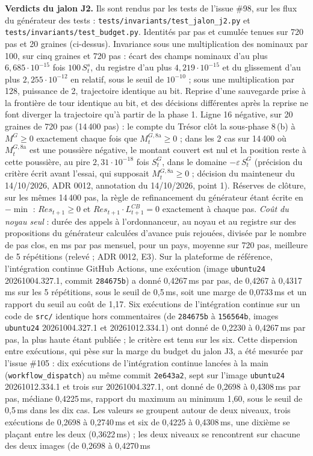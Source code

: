 \documentclass[11pt,a4paper]{article}
\newcommand{\code}[1]{\texttt{\detokenize{#1}}}
\begin{document}
\textbf{Verdicts du jalon J2.} Ils sont rendus par les tests de l'issue \#98, sur les flux du générateur des tests : \nolinkurl{tests/invariants/test_jalon_j2.py} et \nolinkurl{tests/invariants/test_budget.py}. Identités par pas et cumulée tenues sur 720 pas et 20 graines (ci-dessus). Invariance sous une multiplication des nominaux par 100, sur cinq graines et 720 pas : écart des champs nominaux d'au plus $6{,}685 \cdot 10^{-15}$ fois $100\,S^s_t$, du registre d'au plus $4{,}219 \cdot 10^{-15}$ et du glissement d'au plus $2{,}255 \cdot 10^{-12}$ en relatif, sous le seuil de $10^{-10}$ ; sous une multiplication par 128, puissance de 2, trajectoire identique au bit. Reprise d'une sauvegarde prise à la frontière de tour identique au bit, et des décisions différentes après la reprise ne font diverger la trajectoire qu'à partir de la phase 1. Ligne 16 négative, sur 20 graines de 720 pas (14\,400 pas) : le compte du Trésor clôt la sous-phase 8\,(b) à $M^G \ge 0$ exactement chaque fois que $M^{G,8\mathrm{a}}_t \ge 0$ ; dans les 2 cas sur 14\,400 où $M^{G,8\mathrm{a}}_t$ est une poussière négative, le montant couvert est nul et la position reste à cette poussière, au pire $2{,}31 \cdot 10^{-18}$ fois $S^G_t$, dans le domaine $-\varepsilon\,S^G_t$ (précision du critère écrit avant l'essai, qui supposait $M^{G,8\mathrm{a}}_t \ge 0$ ; décision du mainteneur du 14/10/2026, ADR 0012, annotation du 14/10/2026, point 1). Réserves de clôture, sur les mêmes 14\,400 pas, la règle de refinancement du générateur étant écrite en $-\min$ : $\mathit{Res}_{t+1} \ge 0$ et $\mathit{Res}_{t+1} \cdot L^{\mathit{CB}}_{t+1} = 0$ exactement à chaque pas. \emph{Coût du noyau seul} : durée des appels à l'ordonnanceur, au noyau et au registre sur des propositions du générateur calculées d'avance puis rejouées, divisée par le nombre de pas clos, en ms par pas mensuel, pour un pays, moyenne sur 720 pas, meilleure de 5 répétitions (relevé \code{nations.observation.cout.ReleveDuCout} ; ADR 0012, E3). Sur la plateforme de référence, l'intégration continue GitHub Actions, une exécution (image \texttt{ubuntu24} 20261004.327.1, commit \texttt{284675b}) a donné 0,4267\,ms par pas, de 0,4267 à 0,4317\,ms sur les 5 répétitions, sous le seuil de 0,5\,ms, soit une marge de 0,0733\,ms et un rapport du seuil au coût de 1,17. Six exécutions de l'intégration continue sur un code de \nolinkurl{src/} identique hors commentaires (de \texttt{284675b} à \texttt{156564b}, images \texttt{ubuntu24} 20261004.327.1 et 20261012.334.1) ont donné de 0,2230 à 0,4267\,ms par pas, la plus haute étant publiée ; le critère est tenu sur les six. Cette dispersion entre exécutions, qui pèse sur la marge du budget du jalon J3, a été mesurée par l'issue \#105 : dix exécutions de l'intégration continue lancées à la main (\texttt{workflow\_dispatch}) au même commit \texttt{2e643a2}, sept sur l'image \texttt{ubuntu24} 20261012.334.1 et trois sur 20261004.327.1, ont donné de 0,2698 à 0,4308\,ms par pas, médiane 0,4225\,ms, rapport du maximum au minimum 1,60, sous le seuil de 0,5\,ms dans les dix cas. Les valeurs se groupent autour de deux niveaux, trois exécutions de 0,2698 à 0,2740\,ms et six de 0,4225 à 0,4308\,ms, une dixième se plaçant entre les deux (0,3622\,ms) ; les deux niveaux se rencontrent sur chacune des deux images (de 0,2698 à 0,4270\,ms 
\end{document}
